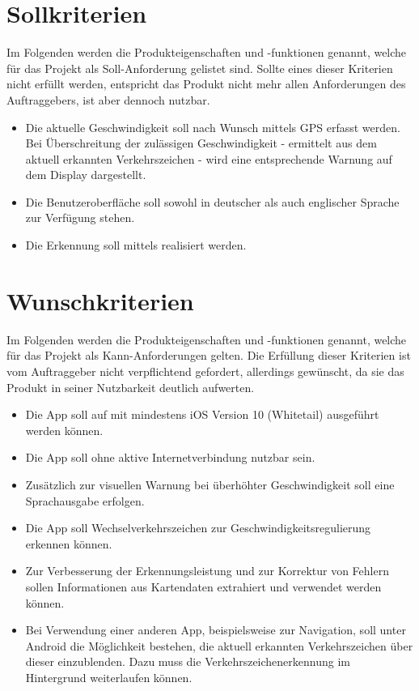 \documentclass[12pt,a4paper,ngerman,enabledeprecatedfontcommands]{scrreprt}
\begin{document}
\section{Sollkriterien}
Im Folgenden werden die Produkteigenschaften und -funktionen genannt, welche für das Projekt als Soll-Anforderung gelistet sind. Sollte eines dieser Kriterien nicht erfüllt werden, entspricht das \gls{Produkt} nicht mehr allen Anforderungen des Auftraggebers, ist aber dennoch nutzbar.

\begin{itemize}
\item Die aktuelle Geschwindigkeit soll nach Wunsch mittels GPS erfasst werden. Bei Überschreitung der zulässigen Geschwindigkeit - ermittelt aus dem aktuell erkannten Verkehrszeichen - wird eine entsprechende Warnung auf dem Display dargestellt.

\item Die Benutzeroberfläche soll sowohl in deutscher als auch englischer Sprache zur Verfügung stehen.

\item Die Erkennung soll mittels  realisiert werden.
\end{itemize}

\section{Wunschkriterien}
Im Folgenden werden die Produkteigenschaften und -funktionen genannt, welche für das Projekt als Kann-Anforderungen gelten. Die Erfüllung dieser Kriterien ist vom Auftraggeber nicht verpflichtend gefordert, allerdings gewünscht, da sie das \gls{Produkt} in seiner Nutzbarkeit deutlich aufwerten.

\begin{itemize}
\item Die \gls{App} soll auf  mit mindestens iOS Version 10 (Whitetail) ausgeführt werden können.

\item Die \gls{App} soll ohne aktive Internetverbindung nutzbar sein.

\item Zusätzlich zur visuellen Warnung bei überhöhter Geschwindigkeit soll eine Sprachausgabe erfolgen.

\item Die \gls{App} soll Wechselverkehrszeichen zur Geschwindigkeitsregulierung erkennen können.

\item Zur Verbesserung der Erkennungsleistung und zur Korrektur von Fehlern sollen Informationen aus Kartendaten extrahiert und verwendet werden können.

\item Bei Verwendung einer anderen \gls{App}, beispielsweise zur Navigation, soll unter Android die Möglichkeit bestehen, die aktuell erkannten Verkehrszeichen über dieser einzublenden. Dazu muss die Verkehrszeichenerkennung im Hintergrund weiterlaufen können.

\end{itemize}
\end{document}
